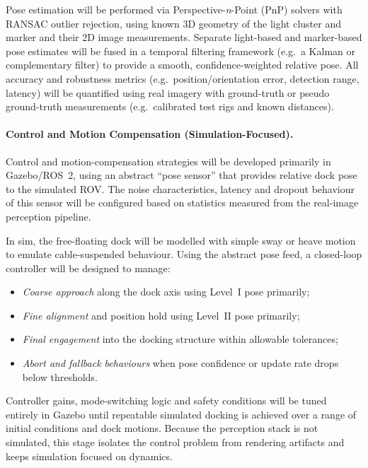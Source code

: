 Pose estimation will be performed via Perspective-\emph{n}-Point (PnP) solvers with RANSAC outlier rejection, using known 3D geometry of the light cluster and marker and their 2D image measurements. Separate light-based and marker-based pose estimates will be fused in a temporal filtering framework (e.g.\ a Kalman or complementary filter) to provide a smooth, confidence-weighted relative pose. All accuracy and robustness metrics (e.g.\ position/orientation error, detection range, latency) will be quantified using real imagery with ground-truth or pseudo ground-truth measurements (e.g.\ calibrated test rigs and known distances).

\paragraph{Control and Motion Compensation (Simulation-Focused).}

Control and motion-compensation strategies will be developed primarily in Gazebo/ROS~2, using an abstract “pose sensor” that provides relative dock pose to the simulated ROV. The noise characteristics, latency and dropout behaviour of this sensor will be configured based on statistics measured from the real-image perception pipeline.

In sim, the free-floating dock will be modelled with simple sway or heave motion to emulate cable-suspended behaviour. Using the abstract pose feed, a closed-loop controller will be designed to manage:

\begin{itemize}
    \item \emph{Coarse approach} along the dock axis using Level~I pose primarily;
    \item \emph{Fine alignment} and position hold using Level~II pose primarily;
    \item \emph{Final engagement} into the docking structure within allowable tolerances;
    \item \emph{Abort and fallback behaviours} when pose confidence or update rate drops below thresholds.
\end{itemize}

Controller gains, mode-switching logic and safety conditions will be tuned entirely in Gazebo until repeatable simulated docking is achieved over a range of initial conditions and dock motions. Because the perception stack is not simulated, this stage isolates the control problem from rendering artifacts and keeps simulation focused on dynamics.

